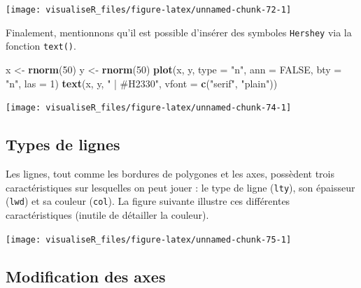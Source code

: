 \documentclass[]{article}
\newenvironment{Shaded}{\begin{snugshade}}{\end{snugshade}}
\newcommand{\DataTypeTok}[1]{\textcolor[rgb]{0.13,0.29,0.53}{#1}}
\newcommand{\DecValTok}[1]{\textcolor[rgb]{0.00,0.00,0.81}{#1}}
\newcommand{\KeywordTok}[1]{\textcolor[rgb]{0.13,0.29,0.53}{\textbf{#1}}}
\newcommand{\NormalTok}[1]{#1}
\newcommand{\OtherTok}[1]{\textcolor[rgb]{0.56,0.35,0.01}{#1}}
\newcommand{\StringTok}[1]{\textcolor[rgb]{0.31,0.60,0.02}{#1}}
\begin{document}
\begin{center}\texttt{[image: visualiseR\_files/figure-latex/unnamed-chunk-72-1]} \end{center}

Finalement, mentionnons qu'il est possible d'insérer des symboles \texttt{Hershey} via la fonction \texttt{text()}.

\begin{Shaded}
\begin{Highlighting}[]
\NormalTok{x <-}\StringTok{ }\KeywordTok{rnorm}\NormalTok{(}\DecValTok{50}\NormalTok{)}
\NormalTok{y <-}\StringTok{ }\KeywordTok{rnorm}\NormalTok{(}\DecValTok{50}\NormalTok{)}
\KeywordTok{plot}\NormalTok{(x, y, }\DataTypeTok{type =} \StringTok{"n"}\NormalTok{, }\DataTypeTok{ann =} \OtherTok{FALSE}\NormalTok{, }\DataTypeTok{bty =} \StringTok{"n"}\NormalTok{, }\DataTypeTok{las =} \DecValTok{1}\NormalTok{)}
\KeywordTok{text}\NormalTok{(x, y, }\StringTok{" | #H2330"}\NormalTok{, }\DataTypeTok{vfont =} \KeywordTok{c}\NormalTok{(}\StringTok{"serif"}\NormalTok{, }\StringTok{"plain"}\NormalTok{))}
\end{Highlighting}
\end{Shaded}

\begin{center}\texttt{[image: visualiseR\_files/figure-latex/unnamed-chunk-74-1]} \end{center}

\hypertarget{types-de-lignes}{%
\subsection{Types de lignes}\label{types-de-lignes}}

Les lignes, tout comme les bordures de polygones et les axes, possèdent trois caractéristiques sur lesquelles on peut jouer : le type de ligne (\texttt{lty}), son épaisseur (\texttt{lwd}) et sa couleur (\texttt{col}). La figure suivante illustre ces différentes caractéristiques (inutile de détailler la couleur).

\begin{center}\texttt{[image: visualiseR\_files/figure-latex/unnamed-chunk-75-1]} \end{center}

\hypertarget{modification-des-axes}{%
\subsection{Modification des axes}\label{modification-des-axes}}
\end{document}
